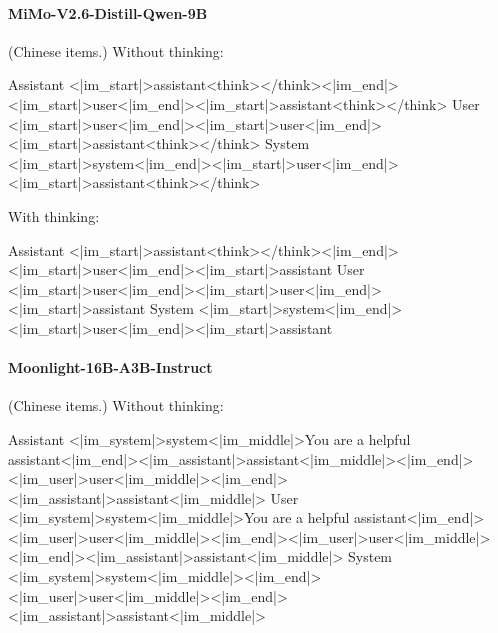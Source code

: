 \paragraph{MiMo-V2.6-Distill-Qwen-9B} (Chinese items.)
\noindent Without thinking:
\begin{Rendering}
Assistant  <|im_start|>assistant\NL{}<think></think><|im_end|><|im_start|>user\NL{}<|im_end|><|im_start|>assistant\NL{}<think></think>
User       <|im_start|>user\NL{}<|im_end|><|im_start|>user\NL{}<|im_end|><|im_start|>assistant\NL{}<think></think>
System     <|im_start|>system\NL{}<|im_end|><|im_start|>user\NL{}<|im_end|><|im_start|>assistant\NL{}<think></think>
\end{Rendering}
\noindent With thinking:
\begin{Rendering}
Assistant  <|im_start|>assistant\NL{}<think></think><|im_end|><|im_start|>user\NL{}<|im_end|><|im_start|>assistant\NL{}
User       <|im_start|>user\NL{}<|im_end|><|im_start|>user\NL{}<|im_end|><|im_start|>assistant\NL{}
System     <|im_start|>system\NL{}<|im_end|><|im_start|>user\NL{}<|im_end|><|im_start|>assistant\NL{}
\end{Rendering}
\paragraph{Moonlight-16B-A3B-Instruct} (Chinese items.)
\noindent Without thinking:
\begin{Rendering}
Assistant  <|im_system|>system<|im_middle|>You are a helpful assistant<|im_end|><|im_assistant|>assistant<|im_middle|><|im_end|><|im_user|>user<|im_middle|><|im_end|><|im_assistant|>assistant<|im_middle|>
User       <|im_system|>system<|im_middle|>You are a helpful assistant<|im_end|><|im_user|>user<|im_middle|><|im_end|><|im_user|>user<|im_middle|><|im_end|><|im_assistant|>assistant<|im_middle|>
System     <|im_system|>system<|im_middle|><|im_end|><|im_user|>user<|im_middle|><|im_end|><|im_assistant|>assistant<|im_middle|>
\end{Rendering}
